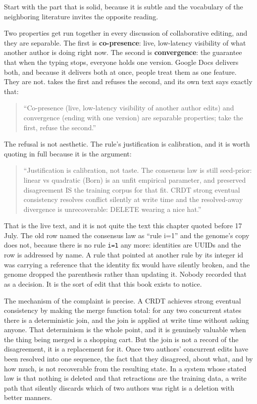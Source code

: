 Start with the part that is solid, because it is subtle and the vocabulary of the neighboring literature invites the opposite reading.

Two properties get run together in every discussion of collaborative editing, and they are separable. The first is \textbf{co-presence}: live, low-latency visibility of what another author is doing right now. The second is \textbf{convergence}: the guarantee that when the typing stops, everyone holds one version. Google Docs delivers both, and because it delivers both at once, people treat them as one feature. They are not.  takes the first and refuses the second, and its own text says exactly that:

\begin{quote}
``Co-presence (live, low-latency visibility of another author edits) and convergence (ending with one version) are separable properties; take the first, refuse the second.''
\end{quote}

The refusal is not aesthetic. The rule's justification is calibration, and it is worth quoting in full because it is the argument:

\begin{quote}
``Justification is calibration, not taste. The consensus law is still seed-prior: linear vs quadratic (Born) is an unfit empirical parameter, and preserved disagreement IS the training corpus for that fit. CRDT strong eventual consistency resolves conflict silently at write time and the resolved-away divergence is unrecoverable: DELETE wearing a nice hat.''
\end{quote}

That is the live text, and it is not quite the text this chapter quoted before 17 July. The old row named the consensus law as ``rule i=1'' and the genome's copy does not, because there is no rule \texttt{i=1} any more: identities are UUIDs and the row is addressed by name. A rule that pointed at another rule by its integer id was carrying a reference that the identity fix would have silently broken, and the genome dropped the parenthesis rather than updating it. Nobody recorded that as a decision. It is the sort of edit that this book exists to notice.

The mechanism of the complaint is precise. A CRDT achieves strong eventual consistency by making the merge function total: for any two concurrent states there is a deterministic join, and the join is applied at write time without asking anyone. That determinism is the whole point, and it is genuinely valuable when the thing being merged is a shopping cart. But the join is not a record of the disagreement, it is a replacement for it. Once two authors' concurrent edits have been resolved into one sequence, the fact that they disagreed, about what, and by how much, is not recoverable from the resulting state. In a system whose stated law is that nothing is deleted and that retractions are the training data, a write path that silently discards which of two authors was right is a deletion with better manners.

